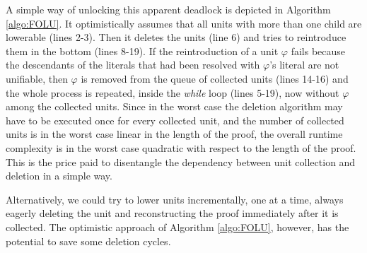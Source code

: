 A simple way of unlocking this apparent deadlock is depicted in Algorithm \ref{algo:FOLU}. It optimistically assumes that all units with more than one child are lowerable (lines 2-3). Then it deletes the units (line 6) and tries to reintroduce them in the bottom (lines 8-19). If the reintroduction of a unit $\varphi$ fails because the descendants of the literals that had been resolved with $\varphi$'s literal are not unifiable, then $\varphi$ is removed from the queue of collected units (lines 14-16) and the whole process is repeated, inside the \emph{while} loop (lines 5-19), now without $\varphi$ among the collected units. Since in the worst case the deletion algorithm may have to be executed once for every collected unit, and the number of collected units is in the worst case linear in the length of the proof, the overall runtime complexity is in the worst case quadratic with respect to the length of the proof. This is the price paid to disentangle the dependency between unit collection and deletion in a simple way.

Alternatively, we could try to lower units incrementally, one at a time, always eagerly deleting the unit and reconstructing the proof immediately after it is collected. The optimistic approach of Algorithm \ref{algo:FOLU}, however, has the potential to save some deletion cycles.




